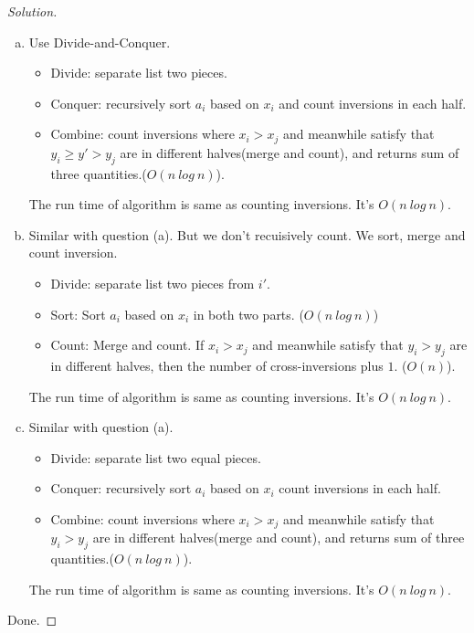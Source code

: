 \documentclass[a4paper]{article}
\newenvironment{solution}
  {\renewcommand\qedsymbol{$\blacksquare$}\begin{proof}[Solution]}
  {\end{proof}}
\begin{document}
\begin{solution}\
  \begin{enumerate}[(a)]
    \item  Use Divide-and-Conquer.
    \begin{itemize}
      \item Divide: separate list two pieces.
      \item Conquer: recursively sort $a_{i}$ based on $x_{i}$ and count inversions in each half.
      \item Combine: count inversions where $x_{i}>x_{j}$ and meanwhile satisfy that $y_{i}\ge y'>y_{j}$ are in different halves(merge and count), and returns sum of three quantities.($O(n\ log\ n)$).
    \end{itemize}
    The run time of algorithm is same as counting inversions. It's $O(n\ log\ n)$.
    \item Similar with question (a). But we don't recuisively count. We sort, merge and count inversion.
    \begin{itemize}
      \item Divide: separate list two pieces from $i'$.
      \item Sort: Sort $a_{i}$ based on $x_{i}$ in both two parts. ($O(n\ log\ n)$)
      \item Count: Merge and count. If $x_{i}>x_{j}$ and meanwhile satisfy that $y_{i}>y_{j}$ are in different halves, then the number of cross-inversions plus $1$. ($O(n)$).
    \end{itemize}
    The run time of algorithm is same as counting inversions. It's $O(n\ log\ n)$.
    \item Similar with question (a).
    \begin{itemize}
      \item Divide: separate list two equal pieces.
      \item Conquer: recursively sort $a_{i}$ based on $x_{i}$ count inversions in each half.
      \item Combine: count inversions where $x_{i}>x_{j}$ and meanwhile satisfy that $y_{i}>y_{j}$ are in different halves(merge and count), and returns sum of three quantities.($O(n\ log\ n)$).
    \end{itemize}
    The run time of algorithm is same as counting inversions. It's $O(n\ log\ n)$.
  \end{enumerate}
  Done.
\end{solution}
\end{document}
